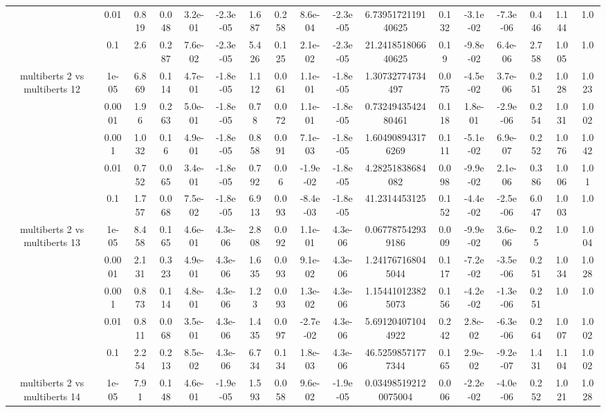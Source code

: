 \begin{tabular}{|c|c|c|c|c|c|c|c|c|c|c|c|c|c|c|c|c|}
 & 0.01 & 0.819 & 0.048 & 3.2e-01 & -2.3e-05 & 1.687 & 0.258 & 8.6e-04 & -2.3e-05 & 6.7395172119140625 & 0.132 & -3.1e-02 & -7.3e-06 & 0.446 & 1.144 & 1.0 \\
 & 0.1 & 2.6 & 0.287 & 7.6e-02 & -2.3e-05 & 5.426 & 0.125 & 2.1e-02 & -2.3e-05 & 21.241851806640625 & 0.19 & -9.8e-02 & 6.4e-06 & 2.758 & 1.005 & 1.0 \\
\hline
\multirow{5}{*}{multiberts 2 vs multiberts 12} & 1e-05 & 6.869 & 0.114 & 4.7e-01 & -1.8e-05 & 1.112 & 0.061 & 1.1e-01 & -1.8e-05 & 1.30732774734497 & 0.075 & -4.5e-02 & 3.7e-06 & 0.251 & 1.028 & 1.023 \\
 & 0.0001 & 1.96 & 0.263 & 5.0e-01 & -1.8e-05 & 0.78 & 0.072 & 1.1e-01 & -1.8e-05 & 0.7324943542480461 & 0.118 & 1.8e-01 & -2.9e-06 & 0.254 & 1.031 & 1.002 \\
 & 0.001 & 1.032 & 0.16 & 4.9e-01 & -1.8e-05 & 0.858 & 0.091 & 7.1e-03 & -1.8e-05 & 1.604908943176269 & 0.111 & -5.1e-02 & 6.9e-07 & 0.252 & 1.076 & 1.042 \\
 & 0.01 & 0.752 & 0.065 & 3.4e-01 & -1.8e-05 & 0.792 & 0.06 & -1.9e-02 & -1.8e-05 & 4.28251838684082 & 0.098 & -9.9e-02 & 2.1e-06 & 0.386 & 1.006 & 1.01 \\
 & 0.1 & 1.757 & 0.068 & 7.5e-02 & -1.8e-05 & 6.913 & 0.093 & -8.4e-03 & -1.8e-05 & 41.2314453125 & 0.152 & -4.4e-02 & -2.5e-06 & 6.047 & 1.003 & 1.0 \\
\hline
\multirow{5}{*}{multiberts 2 vs multiberts 13} & 1e-05 & 8.458 & 0.165 & 4.6e-01 & 4.3e-06 & 2.808 & 0.092 & 1.1e-01 & 4.3e-06 & 0.067787542939186 & 0.009 & -9.9e-02 & 3.6e-06 & 0.25 & 1.0 & 1.004 \\
 & 0.0001 & 2.131 & 0.323 & 4.9e-01 & 4.3e-06 & 1.635 & 0.093 & 9.1e-02 & 4.3e-06 & 1.241767168045044 & 0.117 & -7.2e-02 & -3.5e-06 & 0.251 & 1.034 & 1.028 \\
 & 0.001 & 0.873 & 0.114 & 4.8e-01 & 4.3e-06 & 1.23 & 0.093 & 1.3e-02 & 4.3e-06 & 1.154410123825073 & 0.156 & -4.2e-02 & -1.3e-06 & 0.251 & 1.0 & 1.0 \\
 & 0.01 & 0.811 & 0.068 & 3.5e-01 & 4.3e-06 & 1.435 & 0.097 & -2.7e-02 & 4.3e-06 & 5.691204071044922 & 0.242 & 2.8e-02 & -6.3e-06 & 0.264 & 1.007 & 1.002 \\
 & 0.1 & 2.254 & 0.213 & 8.5e-02 & 4.3e-06 & 6.734 & 0.134 & 1.8e-03 & 4.3e-06 & 46.52598571777344 & 0.165 & 2.9e-02 & -9.2e-07 & 1.431 & 1.104 & 1.002 \\
\hline
\multirow{5}{*}{multiberts 2 vs multiberts 14} & 1e-05 & 7.91 & 0.148 & 4.6e-01 & -1.9e-05 & 1.593 & 0.058 & 9.6e-02 & -1.9e-05 & 0.034985192120075004 & 0.006 & -2.2e-02 & -4.0e-06 & 0.252 & 1.021 & 1.028 \\

\end{tabular}

